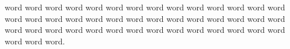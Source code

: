word word word word word word word word word word word word word word word word word word word word word word word word word word word word word word word word word word word word word word word word word word word word word.
